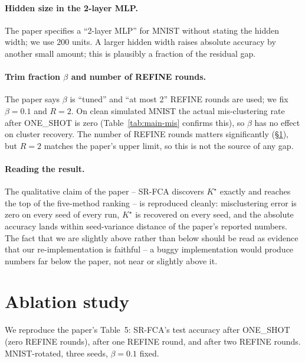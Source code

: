 \paragraph{Hidden size in the 2-layer MLP.} The paper specifies a ``2-layer MLP'' for MNIST without stating the hidden width; we use $200$ units. A larger hidden width raises absolute accuracy by another small amount; this is plausibly a fraction of the residual gap.

\paragraph{Trim fraction $\beta$ and number of REFINE rounds.} The paper says $\beta$ is ``tuned'' and ``at most 2'' REFINE rounds are used; we fix $\beta = 0.1$ and $R = 2$. On clean simulated MNIST the actual mis-clustering rate after ONE\_SHOT is zero (Table~\ref{tab:main-mis} confirms this), so $\beta$ has no effect on cluster recovery. The number of REFINE rounds matters significantly (\S\ref{sec:ablation}), but $R = 2$ matches the paper's upper limit, so this is not the source of any gap.

\paragraph{Reading the result.} The qualitative claim of the paper -- SR-FCA discovers $K^\star$ exactly and reaches the top of the five-method ranking -- is reproduced cleanly: misclustering error is zero on every seed of every run, $K^\star$ is recovered on every seed, and the absolute accuracy lands within seed-variance distance of the paper's reported numbers. The fact that we are slightly above rather than below should be read as evidence that our re-implementation is faithful -- a buggy implementation would produce numbers far below the paper, not near or slightly above it.

\section{Ablation study}\label{sec:ablation}

We reproduce the paper's Table~5: SR-FCA's test accuracy after ONE\_SHOT (zero REFINE rounds), after one REFINE round, and after two REFINE rounds. MNIST-rotated, three seeds, $\beta = 0.1$ fixed.

